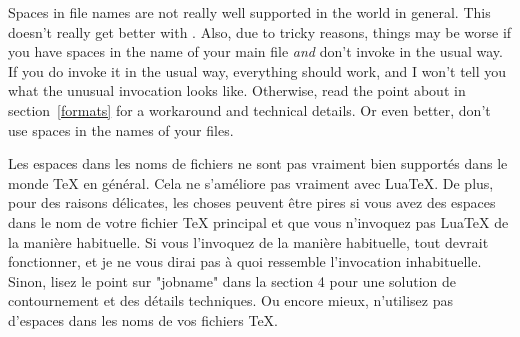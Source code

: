 \documentclass{lltxdoc}
\begin{document}
 Spaces in file names are not really well supported in the \tex
world in general. This doesn't really get better with \luatex. Also, due to
tricky reasons, things may be worse if you have spaces in the name of your main
\tex file \emph{and} don't invoke \luatex in the usual way. If you do
invoke it in the usual way, everything should work, and I won't tell you what
the unusual invocation looks like. Otherwise, read the point about
 in section~\ref{formats} for a workaround and technical
details. Or even better, don't use spaces in the names of your \tex files.

Les espaces dans les noms de fichiers ne sont pas vraiment bien supportés dans le monde TeX en général. Cela ne s'améliore pas vraiment avec LuaTeX. De plus, pour des raisons délicates, les choses peuvent être pires si vous avez des espaces dans le nom de votre fichier TeX principal et que vous n'invoquez pas LuaTeX de la manière habituelle. Si vous l'invoquez de la manière habituelle, tout devrait fonctionner, et je ne vous dirai pas à quoi ressemble l'invocation inhabituelle. Sinon, lisez le point sur "jobname" dans la section 4 pour une solution de contournement et des détails techniques. Ou encore mieux, n'utilisez pas d'espaces dans les noms de vos fichiers TeX.
\end{document}
